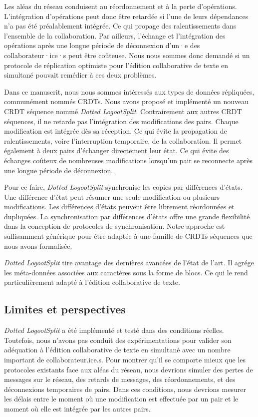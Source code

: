 Les aléas du réseau conduisent au réordonnement et à la perte d'opérations.
L'intégration d'opérations peut donc être retardée si l'une de leurs dépendances n'a pas été préalablement intégrée.
Ce qui propage des ralentissements dans l'ensemble de la collaboration.
Par ailleurs, l'échange et l'intégration des opérations après une longue période de déconnexion d'un·e des collaborateur·ice·s peut être coûteuse.
Nous nous sommes donc demandé si un protocole de réplication optimiste pour l'édition collaborative de texte en simultané pouvait remédier à ces deux problèmes.

Dans ce manuscrit, nous nous sommes intéressés aux types de données répliquées, communément nommés \acp{CRDT}.
Nous avons proposé et implémenté un nouveau \acs{CRDT} séquence nommé \emph{Dotted LogootSplit}.
Contrairement aux autres \acs{CRDT} séquences, il ne retarde pas l'intégration des modifications des pairs.
Chaque modification est intégrée dès sa réception.
Ce qui évite la propagation de ralentissements, voire l'interruption temporaire, de la collaboration.
Il permet également à deux pairs d'échanger directement leur état.
Ce qui évite des échanges coûteux de nombreuses modifications lorsqu'un pair se reconnecte après une longue période de déconnexion.

Pour ce faire, \emph{Dotted LogootSplit} synchronise les copies par différences d'états.
Une différence d'état peut résumer une seule modification ou plusieurs modifications.
Les différences d'états peuvent être librement réordonnées et dupliquées.
La synchronisation par différences d'états offre une grande flexibilité dans la conception de protocoles de synchronisation.
Notre approche est suffisamment générique pour être adaptée à une famille de \acp{CRDT} séquences que nous avons formalisée.

\emph{Dotted LogootSplit} tire avantage des dernières avancées de l'état de l'art.
Il agrége les méta-données associées aux caractères sous la forme de blocs.
Ce qui le rend particulièrement adapté à l'édition collaborative de texte.

\subsection{Limites et perspectives}

\emph{Dotted LogootSplit} a été implémenté et testé dans des conditions réelles.
Toutefois, nous n'avons pas conduit des expérimentations pour valider son adéquation à l'édition collaborative de texte en simultané avec un nombre important de collaborateur.ice.s.
Pour montrer qu'il se comporte mieux que les protocoles existants face aux aléas du réseau, nous devrions simuler des pertes de messages sur le réseau, des retards de messages, des réordonnements, et des déconnexions temporaires de pairs.
Dans ces conditions, nous devrions mesurer les délais entre le moment où une modification est effectuée par un pair et le moment où elle est intégrée par les autres pairs.

